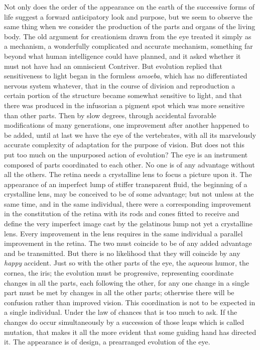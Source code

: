 Not only does the order of the appearance on the earth of the successive forms of life suggest
a forward anticipatory look and purpose, but we seem to observe the same thing when we
consider the production of the parts and organs of the living body. The old argument for
creationism drawn from the eye treated it simply as a mechanism, a wonderfully complicated
and accurate mechanism, something far beyond what human intelligence could have planned,
and it asked whether it must not have had an omniscient Contriver. But evolution replied that
sensitiveness to light began in the formless \textit{amoeba}, which has no differentiated nervous
system whatever, that in the course of division and reproduction a certain portion of the
structure became somewhat sensitive to light, and that there was produced in the infusorian a
pigment spot which was more sensitive than other parts. Then by slow degrees, through
accidental favorable modifications of many generations, one improvement after another
happened to be added, until at last we have the eye of the vertebrates, with all its marvelously
accurate complexity of adaptation for the purpose of vision. But does not this put too much
on the unpurposed action of evolution? The eye is an instrument composed of parts
coordinated to each other. No one is of any advantage without all the others. The retina needs
a crystalline lens to focus a picture upon it. The appearance of an imperfect lump of stiffer
transparent fluid, the beginning of a crystalline lens, may be conceived to be of some
advantage; but not unless at the same time, and in the same individual, there were a
corresponding improvement in the constitution of the retina with its rods and cones fitted to
receive and define the very imperfect image cast by the gelatinous lump not yet a crystalline
lens. Every improvement in the lens requires in the same individual a parallel improvement
in the retina. The two must coincide to be of any added advantage and be transmitted. But
there is no likelihood that they will coincide by any \textit{happy} accident. Just so with the other
parts of the eye, the aqueous humor, the cornea, the iris; the evolution must be progressive,
representing coordinate changes in all the parts, each following the other, for any one change
in a single part must be met by changes in all the other parts; otherwise there will be
confusion rather than improved vision. This coordination is not to be expected in a single
individual. Under the law of chances that is too much to ask. If the changes do occur
simultaneously by a succession of those leaps which is called mutation, that makes it all the
more evident that some guiding hand has directed it. The appearance is of design, a
prearranged evolution of the eye.


